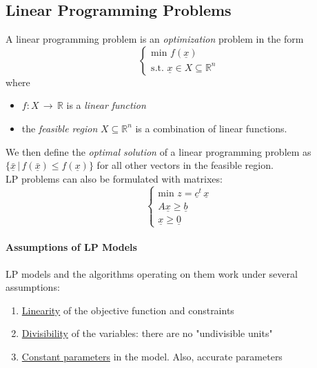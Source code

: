 \documentclass{article}
\begin{document}
		\subsection{Linear Programming Problems}
			A linear programming problem is an \textit{optimization} problem in the form
			\begin{equation}
				\begin{cases}
					\text{min } f(\underline{x})\\
					\text{s.t. } \underline{x} \in X \subseteq \mathbb{R}^n
				\end{cases}
			\end{equation}
			where
			\begin{itemize}
				\item $f: X \,\rightarrow\, \mathbb{R}$ is a \textit{linear function}
				\item the \textit{feasible region} $X \subseteq \mathbb{R}^n$ is a combination of linear functions.
			\end{itemize}
			We then define the \textit{optimal solution} of a linear programming problem as $\{\underline{\bar{x}}\, \vert\, f(\underline{\bar{x}}) \leq f(\underline{x})\}$ for all other vectors in the feasible region.\\
			LP problems can also be formulated with matrixes:
			\begin{equation}
				\begin{cases}
					\text{min } z = \underline{c}^t\, \underline{x}\\
					A\underline{x} \geq \underline{b}\\
					\underline{x} \geq \underline{0}
				\end{cases}
			\end{equation}

			\paragraph{Assumptions of LP Models}
				LP models and the algorithms operating on them work under several assumptions:
				\begin{enumerate}
					\item \underline{Linearity} of the objective function and constraints
					\item \underline{Divisibility} of the variables: there are no "undivisible units"
					\item \underline{Constant parameters} in the model. Also, accurate parameters
				\end{enumerate}
\end{document}
